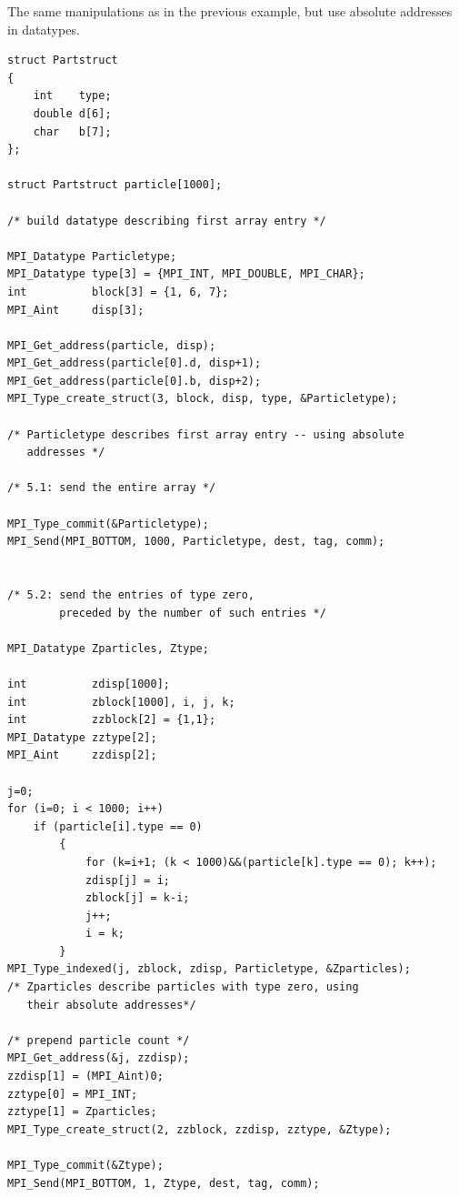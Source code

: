 \begin{example}
\label{pt2pt-exHH}
%
%
The same manipulations as in the previous example, but use absolute
addresses in datatypes.

\begin{lstlisting}[language={[MPI]C}]
struct Partstruct
{
    int    type;
    double d[6];
    char   b[7];
};

struct Partstruct particle[1000];

/* build datatype describing first array entry */

MPI_Datatype Particletype;
MPI_Datatype type[3] = {MPI_INT, MPI_DOUBLE, MPI_CHAR};
int          block[3] = {1, 6, 7};
MPI_Aint     disp[3];

MPI_Get_address(particle, disp);
MPI_Get_address(particle[0].d, disp+1);
MPI_Get_address(particle[0].b, disp+2);
MPI_Type_create_struct(3, block, disp, type, &Particletype);

/* Particletype describes first array entry -- using absolute
   addresses */

/* 5.1: send the entire array */

MPI_Type_commit(&Particletype);
MPI_Send(MPI_BOTTOM, 1000, Particletype, dest, tag, comm);


/* 5.2: send the entries of type zero,
        preceded by the number of such entries */

MPI_Datatype Zparticles, Ztype;

int          zdisp[1000];
int          zblock[1000], i, j, k;
int          zzblock[2] = {1,1};
MPI_Datatype zztype[2];
MPI_Aint     zzdisp[2];

j=0;
for (i=0; i < 1000; i++)
    if (particle[i].type == 0)
        {
            for (k=i+1; (k < 1000)&&(particle[k].type == 0); k++);
            zdisp[j] = i;
            zblock[j] = k-i;
            j++;
            i = k;
        }
MPI_Type_indexed(j, zblock, zdisp, Particletype, &Zparticles);
/* Zparticles describe particles with type zero, using
   their absolute addresses*/

/* prepend particle count */
MPI_Get_address(&j, zzdisp);
zzdisp[1] = (MPI_Aint)0;
zztype[0] = MPI_INT;
zztype[1] = Zparticles;
MPI_Type_create_struct(2, zzblock, zzdisp, zztype, &Ztype);

MPI_Type_commit(&Ztype);
MPI_Send(MPI_BOTTOM, 1, Ztype, dest, tag, comm);
\end{lstlisting}
\end{example}

